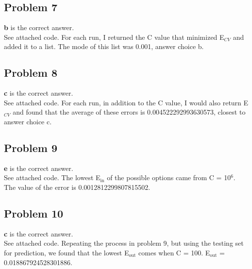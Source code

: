\documentclass[12 pt]{article}
\begin{document}
	\subsection*{Problem 7}
	\textbf{b} is the correct answer. \\
	See attached code. For each run, I returned the C value that minimized E$_{CV}$ and added it to a list. The mode of this list was 0.001, answer choice b.
		
	
	\subsection*{Problem 8}
	\textbf{c} is the correct answer. \\
	See attached code. For each run, in addition to the C value, I would also return E$_{CV}$ and found that the average of these errors is 0.004522292993630573, closest to answer choice c.
	
	\subsection*{Problem 9}
	\textbf{e} is the correct answer. \\
	See attached code. The lowest E$_{\text{in}}$ of the possible options came from C = 10$^6$. The value of the error is 0.0012812299807815502.
	
	\subsection*{Problem 10}
	\textbf{c} is the correct answer. \\
	See attached code. Repeating the process in problem 9, but using the testing set for prediction, we found that the lowest E$_{\text{out}}$ comes when C = 100. E$_{\text{out}}$ = 0.018867924528301886.

	
\end{document}
